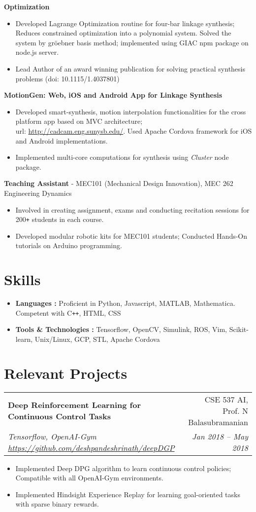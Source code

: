 \documentclass[letterpaper,10pt]{article}
\makeatletter
\newcommand{\resumeHeading}[4]{
  \vspace{-1pt}
    \begin{tabular*}{0.97\textwidth}{l@{\extracolsep{\fill}}r}
      \textbf{#1} & #2 \vspace{-2pt}\\ \vspace{1pt}
      \textit{\small#3} & \textit{\small #4} \\
    \end{tabular*}
}
\newcommand{\resumeSubheading}[1]{
      {\small\textbf{#1}} \\
}
\newcommand{\resumeSubheadingNew}[1]{
      {\small{#1}} \\
}
\newcommand{\resumeSection}[1]{
\vspace{-12pt}
\section{\textbf{#1}}
}
\newcommand{\resumeItemListStart}{
\vspace{-7pt}
\begin{itemize}[leftmargin=14pt]
}
\newcommand{\resumeItemListEnd}{
\vspace{+7pt}
\end{itemize}
}
\newcommand{\resumeItem}[1]{
  \item\small{
      {#1 \vspace{-7pt}
      }
  }
}
\makeatother
\begin{document}
      \vspace{-5pt}
      \resumeSubheading{Optimization}
      \resumeItemListStart
        \resumeItem{Developed Lagrange Optimization routine for four-bar linkage synthesis; Reduces constrained optimization into a polynomial system.
          Solved the system by gr\"{o}ebner basis method; implemented using GIAC npm package on node.js server.}
        \resumeItem{Lead Author of an award winning publication for solving practical synthesis problems (doi: 10.1115/1.4037801)}
      \resumeItemListEnd

      \vspace{-5pt}
      \resumeSubheading{MotionGen: Web, iOS and Android App for Linkage Synthesis}
      \resumeItemListStart
        \resumeItem{Developed smart-synthesis, motion interpolation functionalities for the cross platform app based on MVC architecture; \\ url: \href{http://cadcam.eng.sunysb.edu/}{http://cadcam.eng.sunysb.edu/}. Used Apache Cordova framework for iOS and Android implementations.}
        \resumeItem{Implemented multi-core computations for synthesis using \emph{Cluster} node package.}
      \resumeItemListEnd

      \vspace{-5pt}
      \resumeSubheadingNew{\textbf{Teaching Assistant} - MEC101 (Mechanical Design Innovation), MEC 262 Engineering Dynamics}
      \resumeItemListStart
        \resumeItem{Involved in creating assignment, exams and conducting recitation sessions for 200\texttt{+} students in each course.}
        \resumeItem{Developed modular robotic kits for MEC101 students; Conducted Hands-On tutorials on Arduino programming.}
      \resumeItemListEnd

\resumeSection{Skills}
\vspace{+7pt}
    \resumeItemListStart
      \resumeItem{\textbf{Languages :} Proficient in Python, Javascript, MATLAB, Mathematica. Competent with C\texttt{++}, HTML, CSS}
      \resumeItem{\textbf{Tools \& Technologies :} Tensorflow, OpenCV, Simulink, ROS, Vim, Scikit-learn, Unix/Linux, GCP, STL, Apache Cordova}
    \resumeItemListEnd


    \resumeSection{Relevant Projects}

    \resumeHeading{Deep Reinforcement Learning for Continuous Control Tasks}{CSE 537 AI, Prof. N Balasubramanian}{Tensorflow, OpenAI-Gym \href{https://github.com/deshpandeshrinath/deepDGP}{https://github.com/deshpandeshrinath/deepDGP}}{Jan 2018 -- May 2018}
    \resumeItemListStart
      \resumeItem{Implemented Deep DPG algorithm to learn continuous control policies; Compatible with all OpenAI-Gym environments.}
      \resumeItem{Implemented Hindsight Experience Replay for learning goal-oriented tasks with sparse binary rewards.}
    \resumeItemListEnd
\end{document}
